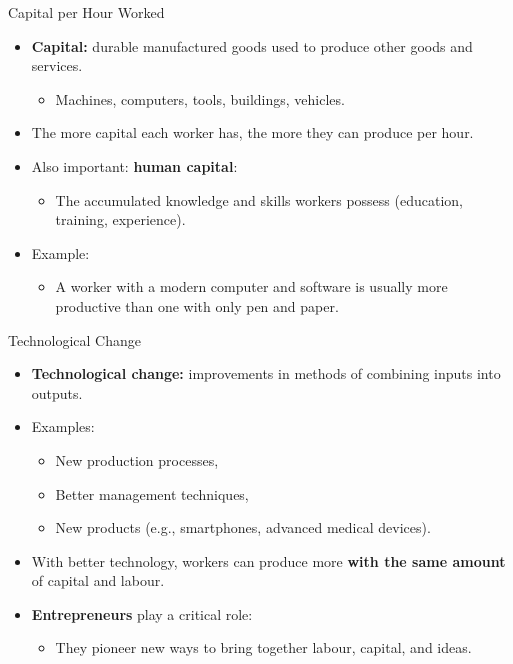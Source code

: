 \documentclass[aspectratio=169]{beamer}
\begin{document}
\begin{frame}{Capital per Hour Worked}
\transfade
\begin{itemize}
  \item \textbf{Capital:} durable manufactured goods used to produce other goods and services.
  \begin{itemize}
    \item Machines, computers, tools, buildings, vehicles.
  \end{itemize}
  \item The more capital each worker has, the more they can produce per hour.
  \item Also important: \textbf{human capital}:
  \begin{itemize}
    \item The accumulated \alert{knowledge and skills} workers possess (education, training, experience).
  \end{itemize}
  \item Example:
  \begin{itemize}
    \item A worker with a modern computer and software is usually more productive than one with only pen and paper.
  \end{itemize}
\end{itemize}
\end{frame}

\begin{frame}{Technological Change}
\transfade
\begin{itemize}
  \item \textbf{Technological change:} improvements in methods of combining inputs into outputs.
  \item Examples:
  \begin{itemize}
    \item New production processes,
    \item Better management techniques,
    \item New products (e.g., smartphones, advanced medical devices).
  \end{itemize}
  \item With better technology, workers can produce more \textbf{with the same amount} of capital and labour.
  \item \textbf{Entrepreneurs} play a critical role:
  \begin{itemize}
    \item They pioneer new ways to bring together labour, capital, and ideas.
  \end{itemize}
\end{itemize}
\end{frame}
\end{document}
